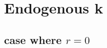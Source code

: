 \documentclass[12pt]{report}
\numberwithin{equation}{section}
\begin{document}











\section{Endogenous k}


\subsection{case where $r=0$}
\end{document}
